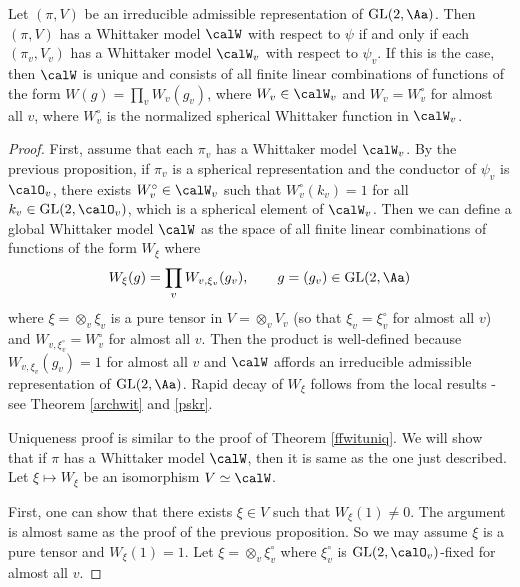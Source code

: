 \begin{theorem}
Let $(\pi, V)$ be an irreducible admissible representation of $\GL(2, \Aa)$. 
Then $(\pi, V)$ has a Whittaker model $\calW$ with respect to $\psi$ if and only if each $(\pi_v, V_v)$ has a Whittaker model $\calW_v$ with respect to $\psi_v$. 
If this is the case, then $\calW$ is unique and consists of all finite linear combinations of functions of the form $W(g) = \prod_{v} W_{v}(g_{v})$, where $W_{v}\in \calW_{v}$ and $W_{v} = W_{v}^{\circ}$ for almost all $v$, where $W_{v}^{\circ}$ is the normalized spherical Whittaker function in $\calW_v$. 
\end{theorem}
\begin{proof}
First, assume that each $\pi_v$ has a Whittaker model $\calW_v$. 
By the previous proposition, if $\pi_v$ is a spherical representation and the conductor of $\psi_v$ is $\calO_v$, there exists $W_v^{\circ} \in \calW_v$ such that $W_{v}^{\circ}(k_v) = 1$ for all $k_v\in \GL(2, \calO_v)$, which is a spherical element of $\calW_v$. 
Then we can define a global Whittaker model $\calW$ as the space of all finite linear combinations of functions of the form $W_{\xi}$ where 
$$
W_{\xi}(g) = \prod_{v} W_{v, \xi_v} (g_v), \qquad g = (g_v) \in \GL(2, \Aa)
$$
where $\xi = \otimes_v \xi_v$ is a pure tensor in $V = \otimes_v V_v$ (so that $\xi_v = \xi_v^{\circ}$ for almost all $v$) and $W_{v, \xi_v^{\circ}} = W_{v}^{\circ}$ for almost all $v$. 
Then the product is well-defined because $W_{v, \xi_v}(g_v) =1$ for almost all $v$ and $\calW$ affords an irreducible admissible representation of $\GL(2, \Aa)$. 
Rapid decay of $W_{\xi}$ follows from the local results - see Theorem \ref{archwit} and \ref{pskr}.

Uniqueness proof is similar to the proof of Theorem \ref{ffwituniq}. We will show that if $\pi$ has a Whittaker model $\calW$, then it is same as the one just described. Let $\xi\mapsto W_{\xi}$ be an isomorphism $V\simeq \calW$. 

First, one can show that there exists $\xi\in V$ such that $W_{\xi}(1) \neq 0$. The argument is almost same as the proof of the previous proposition. 
So we may assume $\xi$ is a pure tensor and $W_{\xi}(1) = 1$. Let $\xi = \otimes_v \xi_v^{\circ}$ where $\xi_v^{\circ}$ is $\GL(2, \calO_v)$-fixed for almost all $v$. 


\end{proof}
